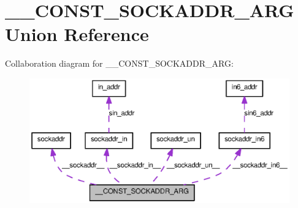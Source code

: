 \section{\_\-\_\-CONST\_\-SOCKADDR\_\-ARG Union Reference}
\label{union____CONST__SOCKADDR__ARG}


Collaboration diagram for \_\-\_\-CONST\_\-SOCKADDR\_\-ARG:
\nopagebreak
\begin{figure}[H]
\begin{center}
\leavevmode
\includegraphics[width=400pt]{union____CONST__SOCKADDR__ARG__coll__graph}
\end{center}
\end{figure}
